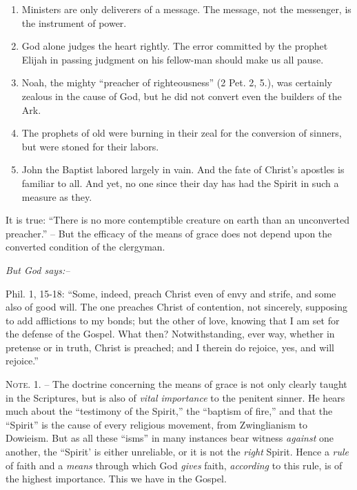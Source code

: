 \documentclass[
]{book}
\begin{document}
\begin{enumerate}
\def\labelenumi{\arabic{enumi}.}
\item
  Ministers are only deliverers of a message. The message, not the messenger, is the instrument of power.
\item
  God alone judges the heart rightly. The error committed by the prophet Elijah in passing judgment on his fellow-man should make us all pause.
\item
  Noah, the mighty ``preacher of righteousness'' (2 Pet. 2, 5.), was certainly zealous in the cause of God, but he did not convert even the builders of the Ark.
\item
  The prophets of old were burning in their zeal for the conversion of sinners, but were stoned for their labors.
\item
  John the Baptist labored largely in vain. And the fate of Christ's apostles is familiar to all. And yet, no one since their day has had the Spirit in such a measure as they.
\end{enumerate}

It is true: ``There is no more contemptible creature on earth than an unconverted preacher.'' -- But the efficacy of the means of grace does not depend upon the converted condition of the clergyman.

\begin{center}
\textsl{But God says:--}
\end{center}

Phil. 1, 15-18: ``Some, indeed, preach Christ even of envy and strife, and some also of good will. The one preaches Christ of contention, not sincerely, supposing to add afflictions to my bonds; but the other of love, knowing that I am set for the defense of the Gospel. What then? Notwithstanding, ever way, whether in pretense or in truth, Christ is preached; and I therein do rejoice, yes, and will rejoice.''

\textsc{Note. 1. --} The doctrine concerning the means of grace is not only clearly taught in the Scriptures, but is also of \emph{vital importance} to the penitent sinner. He hears much about the ``testimony of the Spirit,'' the ``baptism of fire,'' and that the ``Spirit'' is the cause of every religious movement, from Zwinglianism to Dowieism. But as all these ``isms'' in many instances bear witness \emph{against} one another, the ``Spirit' is either unreliable, or it is not the \emph{right} Spirit. Hence a \emph{rule} of faith and a \emph{means} through which God \emph{gives} faith, \emph{according} to this rule, is of the highest importance. This we have in the Gospel.
\end{document}
